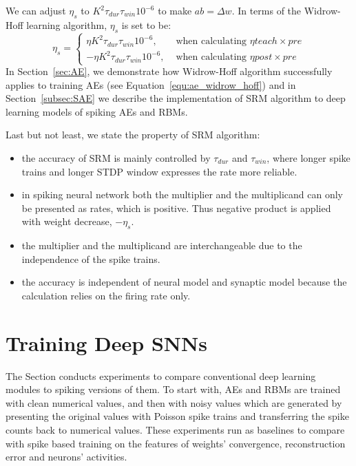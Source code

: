 We can adjust $\eta_s$ to $ K^2 \tau_{dur} \tau_{win}10^{-6}$ to make $ab = \Delta w$.
In terms of the Widrow-Hoff learning algorithm, $\eta_s$ is set to be:
\begin{equation}
	\eta_s=
    \left\{
    \begin{aligned} 
    \eta K^2 \tau_{dur} \tau_{win}10^{-6}, &\text{ when calculating } \eta teach \times pre\\
    - \eta K^2 \tau_{dur} \tau_{win}10^{-6}, &\text{ when calculating } \eta post \times pre
    \end{aligned}
    \right.
    \label{equ:eta_s}
\end{equation}
In Section~\ref{sec:AE}, we demonstrate how Widrow-Hoff algorithm successfully applies to training AEs (see Equation~\ref{equ:ae_widrow_hoff}) and in Section~\ref{subsec:SAE} we describe the implementation of SRM algorithm to deep learning models of spiking AEs and RBMs.

Last but not least, we state the property of SRM algorithm:
\begin{itemize}
	\item the accuracy of SRM is mainly controlled by $\tau_{dur}$ and $\tau_{win}$, where longer spike trains and longer STDP window expresses the rate more reliable.
	\item in spiking neural network both the multiplier and the multiplicand can only be presented as rates, which is positive.
	Thus negative product is applied with weight decrease, $-\eta_s$. 
	\item the multiplier and the multiplicand are interchangeable due to the independence of the spike trains. 
	\item the accuracy is independent of neural model and synaptic model because the calculation relies on the firing rate only.
\end{itemize}
\section{Training Deep SNNs}
\label{sec:dSNN}
The Section conducts experiments to compare conventional deep learning modules to spiking versions of them.
To start with, AEs and RBMs are trained with clean numerical values, and then with noisy values which are generated by presenting the original values with Poisson spike trains and transferring the spike counts back to numerical values.
These experiments run as baselines to compare with spike based training on the features of weights' convergence, reconstruction error and neurons' activities.


